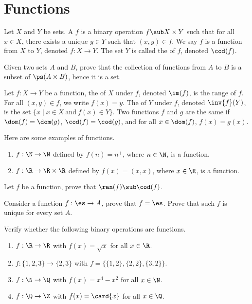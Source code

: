 \documentclass[10pt]{article}
\begin{document}
\section{Functions}
\begin{definition}
    Let $X$ and $Y$ be sets. A  $f$ is a binary operation $f\sub X\times Y$ such that for all $x\in X$, there exists a unique $y\in Y$ such that $(x,y)\in f$. We say $f$ is a function from $X$ to $Y$, denoted $f:X\to Y$. The set $Y$ is called the  of $f$, denoted $\cod(f)$.
\end{definition}
\begin{problem}
    Given two sets $A$ and $B$, prove that the collection of functions from $A$ to $B$ is a subset of $\ps(A\times B)$, hence it is a set.
\end{problem}
\begin{definition}
    Let $f:X\to Y$ be a function, the  of $X$ under $f$, denoted $\im(f)$, is the range of $f$. For all $(x,y)\in f$, we write $f(x)=y$. The  of $Y$ under $f$, denoted $\inv{f}(Y)$, is the set $\{x\mid x\in X\ \text{and}\ f(x)\in Y\}$. Two functions $f$ and $g$ are the same if $\dom(f)=\dom(g)$, $\cod(f)=\cod(g)$, and for all $x\in\dom(f)$, $f(x)=g(x)$.
\end{definition}
\begin{example}
    Here are some examples of functions.
    \begin{enumerate}
        \item $f:\N\to\N$ defined by $f(n)={n}^{+}$, where $n\in\N$, is a function.
        \item $f:\R\to\R\times\R$ defined by $f(x)=(x,x)$, where $x\in\R$, is a function.
    \end{enumerate}
\end{example}
\begin{problem}
    Let $f$ be a function, prove that $\ran(f)\sub\cod(f)$.
\end{problem}
\begin{problem}
    Consider a function $f:\es\to A$, prove that $f=\es$. Prove that such $f$ is unique for every set $A$.
\end{problem}
\begin{problem}
    Verify whether the following binary operations are functions.
    \begin{enumerate}
        \item $f:\R\to\R$ with $f(x)=\sqrt{x}$ for all $x\in\R$.
        \item $f:\{1,2,3\}\to\{2,3\}$ with $f=\{\{1,2\},\{2,2\},\{3,2\}\}$.
        \item $f:\N\to\Q$ with $f(x)={x}^{4}-{x}^{2}$ for all $x\in\N$.
        \item $f:\Q\to\Z$ with $f(x)=\card{x}$ for all $x\in\Q$.
    \end{enumerate}
\end{problem}
\end{document}
